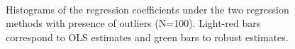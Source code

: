 \documentclass[a4paper]{article}
\begin{document}
\begin{figure}[p]
\begin{center}
{{			}
		}\\ 	%
	\end{center}
	\caption{Histograms of the regression coefficients under the two regression methods with presence of outliers (N=100). Light-red bars correspond to OLS estimates and green bars to robust estimates.}
	\label{Figure2}
\end{figure}
\end{document}

